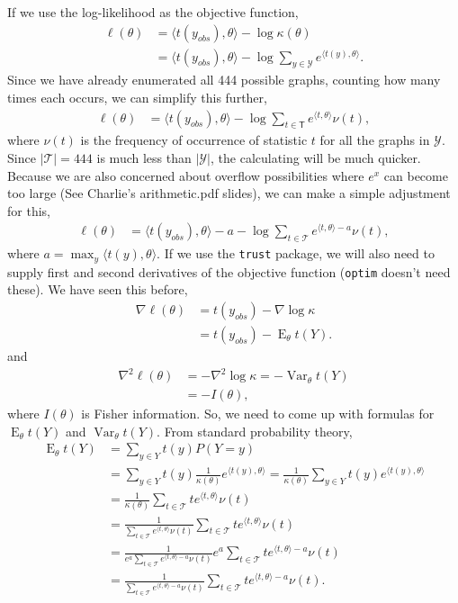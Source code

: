 \documentclass{amsbook}
\DeclareMathOperator{\E}{E}
\DeclareMathOperator{\Var}{Var}
\newcommand{\T}{\mathsf{T}}
\def\YY{{\mathcal Y}}
\def\TT{{\mathcal T}}
\newcommand{\inner}[1]{\langle #1 \rangle}
\theoremstyle{definition}
\theoremstyle{remark}
\begin{document}
If we use the log-likelihood as the objective function,
\begin{align*}
	\ell( \theta) &= \inner{t(y_{obs}), \theta} - \log \kappa( \theta ) \\
				&=  \inner{t(y_{obs}), \theta} - \log \sum_{y \in \YY}e^{\inner{t(y),\theta}}.
\end{align*}
  Since we have already enumerated all 444 possible graphs, counting how many times each occurs, we can simplify this further, 
\begin{align*}
	\ell( \theta) &= \inner{t(y_{obs}), \theta} - \log \sum_{t \in \T}e^{\inner{t,\theta}} \nu(t),
\end{align*}
where $\nu(t)$ is the frequency of occurrence of statistic $t$ for all the graphs in $\YY$.  Since $|\TT| = 444$ is much less than $|\YY|$, the calculating will be much quicker.
Because we are also concerned about overflow possibilities where $e^x$ can become too large (See Charlie's arithmetic.pdf slides), we can make a simple adjustment for this, 
\begin{align*}
	\ell( \theta) &=  \inner{t(y_{obs}), \theta} - a - \log \sum_{t \in \TT}e^{\inner{t,\theta}-a}\nu(t),
\end{align*}
where $a = \max_y \inner{t(y),\theta}$.  If we use the \texttt{trust} package, we will also need to supply first and second derivatives of the objective function (\texttt{optim} doesn't need these).  We have seen this before,
\begin{align*}
	\nabla \ell( \theta ) &= t(y_{obs}) - \nabla \log \kappa \\
						&=  t(y_{obs}) - \E_\theta t(Y). 
\end{align*}
and
\begin{align*}
	\nabla^2 \ell( \theta ) &= - \nabla^2 \log \kappa = - \Var_\theta t(Y)\\
					&= -I(\theta),
\end{align*}
where $I(\theta)$ is Fisher information.  So, we need to come up with formulas for $\E_\theta t(Y)$ and $\Var_\theta t(Y)$.  From standard probability theory, 
\begin{align*}
\E_\theta t(Y) &= \sum_{y\in Y} t(y) P( Y = y )\\
				&= \sum_{y\in Y} t(y) \frac{1}{\kappa(\theta)} e^{\inner{t(y),\theta }} = \frac{1}{\kappa(\theta)} \sum_{y\in Y} t(y)  e^{\inner{t(y),\theta }} \\
				&= \frac{1}{\kappa(\theta)} \sum_{t\in \TT} t  e^{\inner{t,\theta }}\nu(t) \\
				&= \frac{1}{\sum_{t\in \TT} e^{\inner{t,\theta }}\nu(t)} \sum_{t\in \TT} t  e^{\inner{t,\theta }}\nu(t) \\
				&= \frac{1}{e^a\sum_{t\in \TT} e^{\inner{t,\theta}-a}\nu(t)} e^a\sum_{t\in \TT} t  e^{\inner{t,\theta}-a}\nu(t) \\
				&= \frac{1}{\sum_{t\in \TT} e^{\inner{t,\theta}-a}\nu(t)} \sum_{t\in \TT} t  e^{\inner{t,\theta}-a}\nu(t).
\end{align*}
\end{document}
